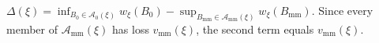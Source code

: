 \(\Delta(\xi)=\inf_{B_0\in\mathcal A_0(\xi)}w_{\xi}(B_0)-\sup_{B_{\mathrm{mm}}\in\mathcal A_{\mathrm{mm}}(\xi)}w_{\xi}(B_{\mathrm{mm}})\).  Since every member of \(\mathcal A_{\mathrm{mm}}(\xi)\) has loss \(v_{\mathrm{mm}}(\xi)\), the second term equals \(v_{\mathrm{mm}}(\xi)\).
